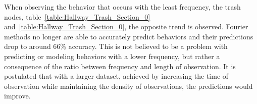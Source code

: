 \begin{table}[h!]
  \centering
  \caption{Hallway Meal Section 1}
  \label{table:Hallway_Meal_Section_1}
\end{table}


When observing the behavior that occurs with the least frequency, the trash
nodes, table~\ref{table:Hallway_Trash_Section_0} and~\ref{table:Hallway_Trash_Section_0},
the opposite trend is observed. Fourier methods no longer are able to
accurately predict behaviors and their predictions drop to around 66\% accuracy.
This is not believed to be a problem with predicting or modeling behaviors with a
lower frequency, but rather a consequence of the ratio between frequency and
length of observation. It is postulated that
with a larger dataset, achieved by increasing the time of observation while
maintaining the density of observations, the predictions would improve. \\


